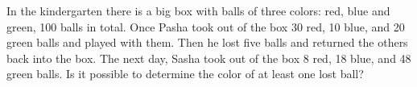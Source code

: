 In the kindergarten there is a big box with balls of three colors: red, blue and green, 100 balls in total. Once Pasha took out of the box 30 red, 10 blue, and 20 green balls and played with them. Then he lost five balls and returned the others back into the box. The next day, Sasha took out of the box 8 red, 18 blue, and 48 green balls. Is it possible to determine the color of at least one lost ball?